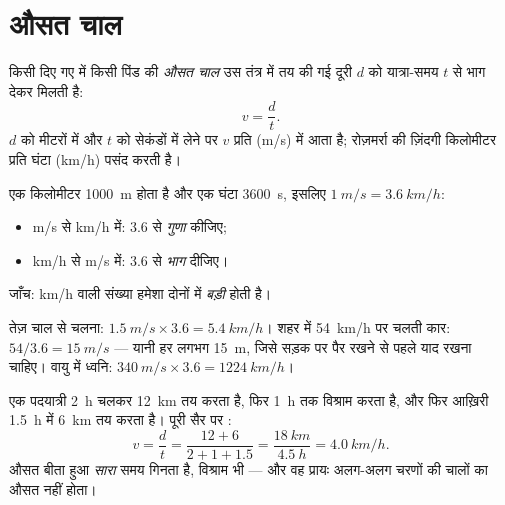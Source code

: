 \section{औसत चाल}

\begin{definition}[औसत चाल]\label{def:g10:relative-motion:speed}
किसी दिए गए  में किसी पिंड की \emph{औसत
चाल} उस तंत्र में तय की गई दूरी $d$ को यात्रा-समय
$t$ से भाग देकर मिलती है:
\[
v = \frac{d}{t} .
\]
$d$ को मीटरों में और $t$ को सेकंडों में लेने पर $v$
 प्रति  (\unit{m/s}) में आता है; रोज़मर्रा की ज़िंदगी
किलोमीटर प्रति घंटा (\unit{km/h}) पसंद करती है।
\end{definition}

\begin{method}[m/s और km/h के बीच बदलना]\label{met:g10:relative-motion:convert}
एक किलोमीटर \qty{1000}{m} होता है और एक घंटा \qty{3600}{s}, इसलिए $\qty{1}{m/s} = \qty{3.6}{km/h}$:
\begin{itemize}
  \item \unit{m/s} से \unit{km/h} में: $3.6$ से \emph{गुणा} कीजिए;
  \item \unit{km/h} से \unit{m/s} में: $3.6$ से \emph{भाग} दीजिए।
\end{itemize}
जाँच: \unit{km/h} वाली संख्या हमेशा दोनों में \emph{बड़ी} होती है।
\end{method}

\begin{example}[जानने लायक कुछ चालें]\label{ex:g10:relative-motion:convert}
तेज़ चाल से चलना: $\qty{1.5}{m/s} \times 3.6 = \qty{5.4}{km/h}$। शहर में \qty{54}{km/h} पर चलती कार: $54 / 3.6 = \qty{15}{m/s}$ --- यानी
हर  लगभग \qty{15}{m}, जिसे सड़क पर पैर रखने से पहले याद रखना चाहिए। वायु
में ध्वनि: $\qty{340}{m/s} \times 3.6 = \qty{1224}{km/h}$।
\end{example}

\begin{example}[बीच में विश्राम वाली एक पदयात्रा]\label{ex:g10:relative-motion:hike}
एक पदयात्री \qty{2}{h} चलकर \qty{12}{km} तय करता है, फिर \qty{1}{h} तक
विश्राम करता है, और फिर आख़िरी \qty{1.5}{h} में \qty{6}{km} तय करता है।
पूरी सैर पर :
\[
v = \frac{d}{t} = \frac{12 + 6}{2 + 1 + 1.5}
= \frac{\qty{18}{km}}{\qty{4.5}{h}} = \qty{4.0}{km/h}.
\]
औसत बीता हुआ \emph{सारा} समय गिनता है, विश्राम भी --- और वह प्रायः
अलग-अलग चरणों की चालों का औसत नहीं होता।
\end{example}

